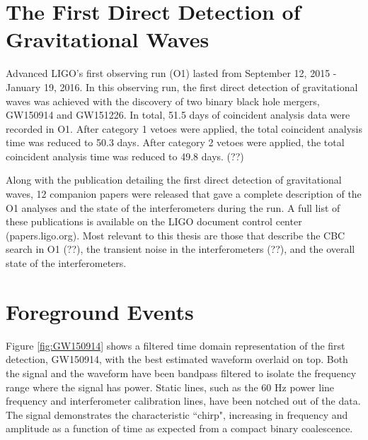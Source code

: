 \section{The First Direct Detection of Gravitational Waves}

Advanced LIGO's first observing run (O1) lasted from September 12, 2015 - 
January 19, 2016. In this observing run, the first direct detection of 
gravitational waves was achieved with the discovery of two binary black 
hole mergers, GW150914 and GW151226. 
In total, 51.5 days of coincident analysis data were recorded in O1. 
After category 1 vetoes were applied, the total coincident analysis 
time was reduced to 50.3 days. After category 2 vetoes were applied, 
the total coincident analysis time was reduced to 49.8 days. (??) 

Along with the publication detailing the first direct detection of 
gravitational waves, 12 companion papers were released 
that gave a complete description of the O1 analyses and the state 
of the interferometers during the run. A full list of these 
publications is available on the LIGO document control center 
(papers.ligo.org). 
Most relevant to this thesis are those that describe the CBC search 
in O1 (??), the transient noise in the interferometers (??), and the 
overall state of the interferometers. 

\section{Foreground Events}

Figure \ref{fig:GW150914} shows a 
filtered time domain representation of the first detection, 
GW150914, with the best estimated 
waveform overlaid on top. Both the signal and the waveform have been 
bandpass filtered to isolate the frequency range where the signal has 
power. Static lines, such as the 60 Hz power line frequency and 
interferometer calibration lines, have been notched out of the data. 
The signal demonstrates the characteristic ``chirp", 
increasing in frequency and amplitude as a function of time as  
expected from a compact binary coalescence. 

